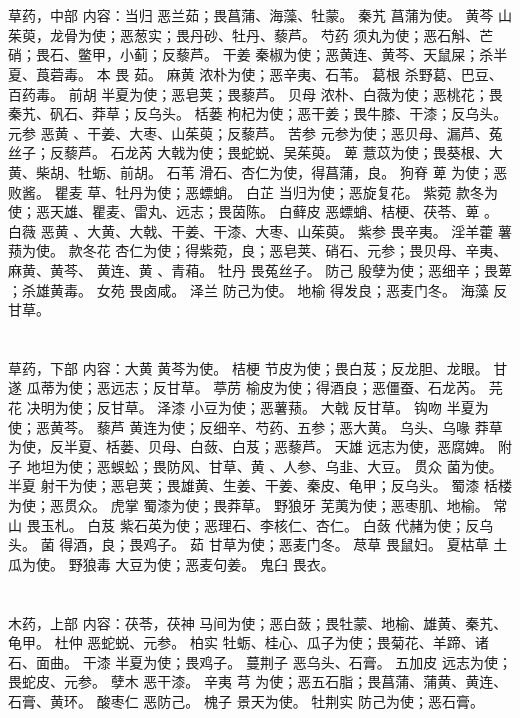 \documentclass[12pt,UTF8]{ctexbook}
\begin{document}
\chapter{}草药，中部
内容：当归 恶兰茹；畏菖蒲、海藻、牡蒙。 
秦艽 菖蒲为使。 
黄芩 山茱萸，龙骨为使；恶葱实；畏丹砂、牡丹、藜芦。 
芍药 须丸为使；恶石斛、芒硝；畏石、鳖甲，小蓟；反藜芦。 
干姜 秦椒为使；恶黄连、黄芩、天鼠屎；杀半夏、莨菪毒。 
本 畏 茹。 
麻黄 浓朴为使；恶辛夷、石苇。 
葛根 杀野葛、巴豆、百药毒。 
前胡 半夏为使；恶皂荚；畏藜芦。 
贝母 浓朴、白薇为使；恶桃花；畏秦艽、矾石、莽草；反乌头。 
栝蒌 枸杞为使；恶干姜；畏牛膝、干漆；反乌头。 
元参 恶黄 、干姜、大枣、山茱萸；反藜芦。 
苦参 元参为使；恶贝母、漏芦、菟丝子；反藜芦。 
石龙芮 大戟为使；畏蛇蜕、吴茱萸。 
萆 薏苡为使；畏葵根、大黄、柴胡、牡蛎、前胡。 
石苇 滑石、杏仁为使，得菖蒲，良。 
狗脊 萆 为使；恶败酱。 
瞿麦 草、牡丹为使；恶螵蛸。 
白芷 当归为使；恶旋复花。 
紫菀 款冬为使；恶天雄、瞿麦、雷丸、远志；畏茵陈。 
白藓皮 恶螵蛸、桔梗、茯苓、萆 。 
白薇 恶黄 、大黄、大戟、干姜、干漆、大枣、山茱萸。 
紫参 畏辛夷。 
淫羊藿 薯蓣为使。 
款冬花 杏仁为使；得紫菀，良；恶皂荚、硝石、元参；畏贝母、辛夷、麻黄、黄芩、 
黄连、黄 、青葙。 
牡丹 畏菟丝子。 
防己 殷孽为使；恶细辛；畏萆 ；杀雄黄毒。 
女苑 畏卤咸。 
泽兰 防己为使。 
地榆 得发良；恶麦门冬。 
海藻 反甘草。 


\chapter{}草药，下部
内容：大黄 黄芩为使。 
桔梗 节皮为使；畏白芨；反龙胆、龙眼。 
甘遂 瓜蒂为使；恶远志；反甘草。 
葶苈 榆皮为使；得酒良；恶僵蚕、石龙芮。 
芫花 决明为使；反甘草。 
泽漆 小豆为使；恶薯蓣。 
大戟 反甘草。 
钩吻 半夏为使；恶黄芩。 
藜芦 黄连为使；反细辛、芍药、五参；恶大黄。 
乌头、乌喙 莽草为使，反半夏、栝蒌、贝母、白蔹、白芨；恶藜芦。 
天雄 远志为使，恶腐婢。 
附子 地坦为使；恶蜈蚣；畏防风、甘草、黄 、人参、乌韭、大豆。 
贯众 菌为使。 
半夏 射干为使；恶皂荚；畏雄黄、生姜、干姜、秦皮、龟甲；反乌头。 
蜀漆 栝楼为使；恶贯众。 
虎掌 蜀漆为使；畏莽草。 
野狼牙 芜荑为使；恶枣肌、地榆。 
常山 畏玉札。 
白芨 紫石英为使；恶理石、李核仁、杏仁。 
白蔹 代赭为使；反乌头。 
菌 得酒，良；畏鸡子。 
茹 甘草为使；恶麦门冬。 
荩草 畏鼠妇。 
夏枯草 土瓜为使。 
野狼毒 大豆为使；恶麦句姜。 
鬼臼 畏衣。 


\chapter{}木药，上部
内容：茯苓，茯神 马间为使；恶白蔹；畏牡蒙、地榆、雄黄、秦艽、龟甲。 
杜仲 恶蛇蜕、元参。 
柏实 牡蛎、桂心、瓜子为使；畏菊花、羊蹄、诸石、面曲。 
干漆 半夏为使；畏鸡子。 
蔓荆子 恶乌头、石膏。 
五加皮 远志为使；畏蛇皮、元参。 
孽木 恶干漆。 
辛夷 芎 为使；恶五石脂；畏菖蒲、蒲黄、黄连、石膏、黄环。 
酸枣仁 恶防己。 
槐子 景天为使。 
牡荆实 防己为使；恶石膏。 
\end{document}
